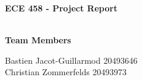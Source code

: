 \documentclass[12pt,letter,titlepage]{article}
\title{\mytitle}
\author{Bastien Jacot-Guillarmod, Christian Zommerfelds}
\begin{document}
\begin{center}
  {\bf \Large 
    ECE 458 - Project Report\\
   \LARGE
    \\
  }
\end{center}
\vspace{0.2cm}

{\bf Team Members}
\vspace{0.1cm}

\noindent Bastien Jacot-Guillarmod \tabto{6cm} 20493646 \\
\noindent Christian Zommerfelds    \tabto{6cm} 20493973

\end{document}
